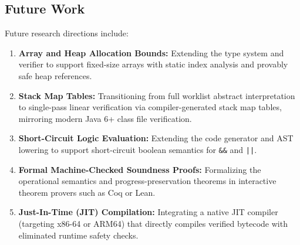 \documentclass[conference]{IEEEtran}
\begin{document}
\subsection{Future Work}
Future research directions include:
\begin{enumerate}
    \item \textbf{Array and Heap Allocation Bounds:} Extending the type system and verifier to support fixed-size arrays with static index analysis and provably safe heap references.
    \item \textbf{Stack Map Tables:} Transitioning from full worklist abstract interpretation to single-pass linear verification via compiler-generated stack map tables, mirroring modern Java 6+ class file verification.
    \item \textbf{Short-Circuit Logic Evaluation:} Extending the code generator and AST lowering to support short-circuit boolean semantics for \texttt{\&\&} and \texttt{||}.
    \item \textbf{Formal Machine-Checked Soundness Proofs:} Formalizing the operational semantics and progress-preservation theorems in interactive theorem provers such as Coq or Lean.
    \item \textbf{Just-In-Time (JIT) Compilation:} Integrating a native JIT compiler (targeting x86-64 or ARM64) that directly compiles verified bytecode with eliminated runtime safety checks.
\end{enumerate}
\end{document}
